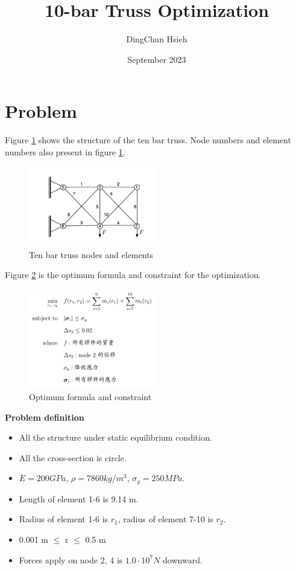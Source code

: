 \documentclass{article}
\title{10-bar Truss Optimization}
\author{DingChun Hsieh}
\date{September 2023}
\begin{document}
\maketitle

\section{Problem}

Figure \ref{fig:Figure 1} shows the structure of the ten bar truss.
Node numbers and element numbers also present in figure \ref{fig:Figure 1}.
\begin{figure}[h]
    \centering
    \includegraphics[width=0.5\textwidth]{../images/ten bar.png}
    \caption{Ten bar truss nodes and elements}
    \label{fig:Figure 1}
\end{figure}

Figure \ref{fig:Figure 2} is the optimum formula and constraint for the optimization.   
\begin{figure}[h]
    \centering
    \includegraphics[width=0.5\textwidth]{../images/constraint.png}
    \caption{Optimum formula and constraint}
    \label{fig:Figure 2}
\end{figure}
\clearpage
\textbf{Problem definition}
\begin{itemize}
	\item All the structure under static equilibrium condition.
	\item All the cross-section is circle.
	\item $E = 200 GPa $, $\rho = 7860 kg/ m^3  $, $ \sigma_y = 250 MPa $.
	\item Length of element 1-6 is 9.14 m.
	\item Radius of element 1-6 is $r_1  $, radius of element 7-10 is $r_2$.
	\item 0.001 m $\le$ r $\le$ 0.5 m
	\item Forces apply on node 2, 4 is $ 1.0 \cdot 10^7 N $ downward.
\end{itemize}
\end{document}
